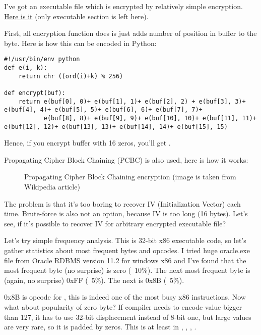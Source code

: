 
I've got an executable file which is encrypted by relatively simple encryption.
\href{https://github.com/DennisYurichev/RE-for-beginners/blob/master/examples/simple_exec_crypto/files/cipher.bin}{Here is it} (only executable section is left here).

First, all encryption function does is just adds number of position in buffer to the byte.
Here is how this can be encoded in Python:

\begin{lstlisting}[caption=Python script,style=custompy]
#!/usr/bin/env python
def e(i, k):
    return chr ((ord(i)+k) % 256)

def encrypt(buf):
    return e(buf[0], 0)+ e(buf[1], 1)+ e(buf[2], 2) + e(buf[3], 3)+ e(buf[4], 4)+ e(buf[5], 5)+ e(buf[6], 6)+ e(buf[7], 7)+
           e(buf[8], 8)+ e(buf[9], 9)+ e(buf[10], 10)+ e(buf[11], 11)+ e(buf[12], 12)+ e(buf[13], 13)+ e(buf[14], 14)+ e(buf[15], 15)
\end{lstlisting}

Hence, if you encrypt buffer with 16 zeros, you'll get .

Propagating Cipher Block Chaining (PCBC) is also used, here is how it works:

\begin{figure}[H]
\centering
{}
\caption{Propagating Cipher Block Chaining encryption (image is taken from Wikipedia article)}
\end{figure}

The problem is that it's too boring to recover IV (Initialization Vector) each time.
Brute-force is also not an option, because IV is too long (16 bytes).
Let's see, if it's possible to recover IV for arbitrary encrypted executable file?

Let's try simple frequency analysis.
This is 32-bit x86 executable code, so let's gather statistics about most frequent bytes and opcodes.
I tried huge oracle.exe file from Oracle RDBMS version 11.2 for windows x86 and I've found that the most frequent byte (no surprise) is zero (~10\%).
The next most frequent byte is (again, no surprise) 0xFF (~5\%).
The next is 0x8B (~5\%).

0x8B is opcode for , this is indeed one of the most busy x86 instructions.
Now what about popularity of zero byte?
If compiler needs to encode value bigger than 127, it has to use 32-bit displacement instead of 8-bit one, but large values are very rare,
so it is padded by zeros.
This is at least in , , , .

